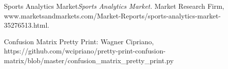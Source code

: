 \documentclass[11pt, a4paper, BCOR=10mm, english]{scrbook}
\begin{document}
    \pagestyle{empty} %
    \hypersetup{pageanchor=false}
    
    \pagestyle{plain} %
    \frontmatter  %

    
    \tableofcontents
    \listoffigures
    \listoftables
    \hypersetup{pageanchor=true}  %

    \setlength{\parindent}{10ex}
    \mainmatter  %
    
    
    
    
    




    \begin{thebibliography}{1}

         Sports Analytics Market{\em Sports Analytics Market.} Market Research Firm, www.marketsandmarkets.com/Market-Reports/sports-analytics-market-35276513.html.

         Confusion Matrix Pretty Print: Wagner Cipriano, https://github.com/wcipriano/pretty-print-confusion-matrix/blob/master/confusion_matrix_pretty_print.py

        \end{thebibliography}
\end{document}
